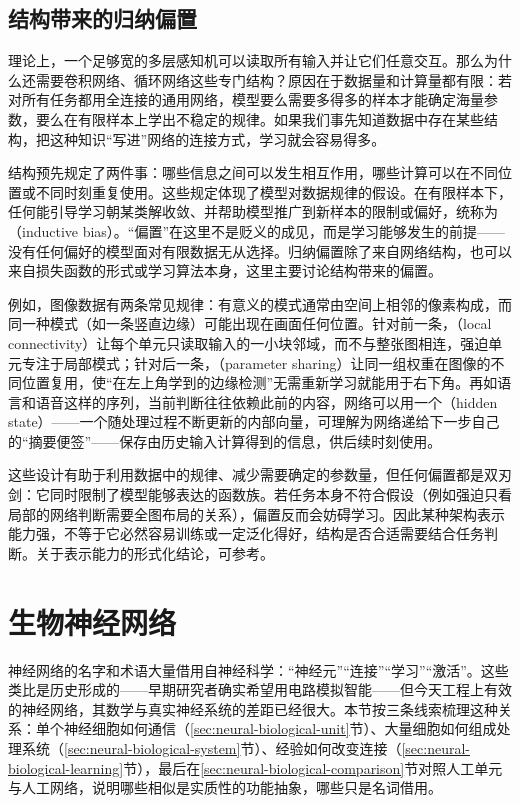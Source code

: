 \subsection{结构带来的归纳偏置}
\label{sec:neural-structural-bias}

理论上，一个足够宽的多层感知机可以读取所有输入并让它们任意交互。那么为什么还需要卷积网络、循环网络这些专门结构？原因在于数据量和计算量都有限：若对所有任务都用全连接的通用网络，模型要么需要多得多的样本才能确定海量参数，要么在有限样本上学出不稳定的规律。如果我们事先知道数据中存在某些结构，把这种知识“写进”网络的连接方式，学习就会容易得多。

结构预先规定了两件事：哪些信息之间可以发生相互作用，哪些计算可以在不同位置或不同时刻重复使用。这些规定体现了模型对数据规律的假设。在有限样本下，任何能引导学习朝某类解收敛、并帮助模型推广到新样本的限制或偏好，统称为（inductive bias）。“偏置”在这里不是贬义的成见，而是学习能够发生的前提——没有任何偏好的模型面对有限数据无从选择。归纳偏置除了来自网络结构，也可以来自损失函数的形式或学习算法本身，这里主要讨论结构带来的偏置。

例如，图像数据有两条常见规律：有意义的模式通常由空间上相邻的像素构成，而同一种模式（如一条竖直边缘）可能出现在画面任何位置。针对前一条，（local connectivity）让每个单元只读取输入的一小块邻域，而不与整张图相连，强迫单元专注于局部模式；针对后一条，（parameter sharing）让同一组权重在图像的不同位置复用，使“在左上角学到的边缘检测”无需重新学习就能用于右下角。再如语言和语音这样的序列，当前判断往往依赖此前的内容，网络可以用一个（hidden state）——一个随处理过程不断更新的内部向量，可理解为网络递给下一步自己的“摘要便签”——保存由历史输入计算得到的信息，供后续时刻使用。

这些设计有助于利用数据中的规律、减少需要确定的参数量，但任何偏置都是双刃剑：它同时限制了模型能够表达的函数族。若任务本身不符合假设（例如强迫只看局部的网络判断需要全图布局的关系），偏置反而会妨碍学习。因此某种架构表示能力强，不等于它必然容易训练或一定泛化得好，结构是否合适需要结合任务判断。关于表示能力的形式化结论，可参考。

\section{生物神经网络}
\label{sec:neural-biological-inspiration}

神经网络的名字和术语大量借用自神经科学：“神经元”“连接”“学习”“激活”。这些类比是历史形成的——早期研究者确实希望用电路模拟智能——但今天工程上有效的神经网络，其数学与真实神经系统的差距已经很大。本节按三条线索梳理这种关系：单个神经细胞如何通信（\ref{sec:neural-biological-unit}节）、大量细胞如何组成处理系统（\ref{sec:neural-biological-system}节）、经验如何改变连接（\ref{sec:neural-biological-learning}节），最后在\ref{sec:neural-biological-comparison}节对照人工单元与人工网络，说明哪些相似是实质性的功能抽象，哪些只是名词借用。

